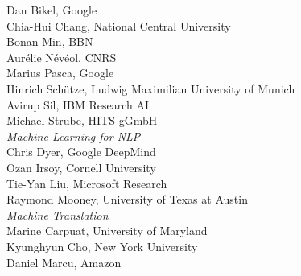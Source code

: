                                     \hspace*{0.2in} Dan Bikel, Google \\
                                    \hspace*{0.2in} Chia-Hui Chang, National Central University \\
                                    \hspace*{0.2in} Bonan Min, BBN \\
                                    \hspace*{0.2in} Aur\'{e}lie N\'{e}v\'{e}ol, CNRS \\
                                    \hspace*{0.2in} Marius Pasca, Google \\
                                    \hspace*{0.2in} Hinrich Sch\"{u}tze, Ludwig Maximilian University of Munich \\
                                    \hspace*{0.2in} Avirup Sil, IBM Research AI \\
                                    \hspace*{0.2in} Michael Strube, HITS gGmbH \\
                            \emph{Machine Learning for NLP} \\
                                    \hspace*{0.2in} Chris Dyer, Google DeepMind \\
                                    \hspace*{0.2in} Ozan Irsoy, Cornell University \\
                                    \hspace*{0.2in} Tie-Yan Liu, Microsoft Research \\
                                    \hspace*{0.2in} Raymond Mooney, University of Texas at Austin  \\
                            \emph{Machine Translation} \\
                                    \hspace*{0.2in} Marine Carpuat, University of Maryland \\
                                    \hspace*{0.2in} Kyunghyun Cho, New York University \\
                                    \hspace*{0.2in} Daniel Marcu, Amazon \\
